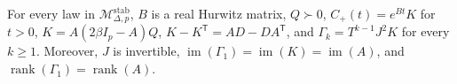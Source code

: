 For every law in \(\mathcal M_{\Delta,p}^{\mathrm{stab}}\), \(B\) is a real Hurwitz matrix, \(Q\succ0\), \(C_{+}(t)=e^{Bt}K\) for \(t>0\), \(K=A(2\beta I_p-A)Q\), \(K-K^{\mathsf T}=AD-DA^{\mathsf T}\), and \(\Gamma_k=T^{k-1}J^2K\) for every \(k\geq1\). Moreover, \(J\) is invertible, \(\operatorname{im}(\Gamma_1)=\operatorname{im}(K)=\operatorname{im}(A)\), and \(\operatorname{rank}(\Gamma_1)=\operatorname{rank}(A)\).
